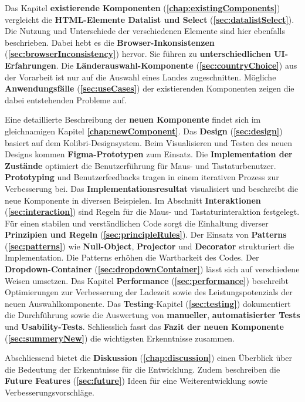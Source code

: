 Das Kapitel \textbf{existierende Komponenten} (\textbf{\ref{chap:existingComponents}}) vergleicht die \textbf{HTML-Elemente Datalist und Select} (\textbf{\ref{sec:datalistSelect}}). 
Die Nutzung und Unterschiede der verschiedenen Elemente sind hier ebenfalls beschrieben. 
Dabei hebt es die \textbf{Browser-Inkonsistenzen} (\textbf{\ref{sec:browserInconsistency}}) hervor. 
Sie führen zu \textbf{unterschiedlichen UI-Erfahrungen}. 
Die \textbf{Länderauswahl-Kom\-po\-nente} (\textbf{\ref{sec:countryChoice}}) aus der Vorarbeit ist nur auf die Auswahl eines Landes zugeschnitten. 
Mögliche \textbf{Anwendungsfälle} (\textbf{\ref{sec:useCases}}) der existierenden Komponenten zeigen die dabei entstehenden Probleme auf. 

Eine detaillierte Beschreibung der \textbf{neuen Komponente} findet sich im gleichnamigen Kapitel \textbf{\ref{chap:newComponent}}. 
Das \textbf{Design} (\textbf{\ref{sec:design}}) basiert auf dem Kolibri-Designsystem. 
Beim Visualisieren und Testen des neuen Designs kommen \textbf{Figma-Prototypen} zum Einsatz. 
Die \textbf{Implementation der Zustände} optimiert die Benutzerführung für Maus- und Tastaturbenutzer. 
\textbf{Prototyping} und Benutzerfeedbacks tragen in einem iterativen Prozess zur Verbesserung bei.
Das \textbf{Implementationsresultat} visualisiert und beschreibt die neue Komponente in diversen Beispielen.
Im Abschnitt \textbf{Interaktionen} (\textbf{\ref{sec:interaction}}) sind Regeln für die Maus- und Tastaturinteraktion festgelegt. 
Für einen stabilen und verständlichen Code sorgt die Einhaltung diverser \textbf{Prinzipien und Regeln} (\textbf{\ref{sec:principleRules}}). 
Der Einsatz von \textbf{Patterns} (\textbf{\ref{sec:patterns}}) wie \textbf{Null-Object}, \textbf{Projector} und \textbf{Decorator} strukturiert die Implementation. 
Die Patterns erhöhen die Wartbarkeit des Codes. 
Der \textbf{Dropdown-Container} (\textbf{\ref{sec:dropdownContainer}}) lässt sich auf verschiedene Weisen umsetzen. 
Das Kapitel \textbf{Performance} (\textbf{\ref{sec:performance}}) beschreibt Optimierungen zur Verbesserung der Ladezeit sowie des Leistungspotenzials der neuen Auswahlkomponente. 
Das \textbf{Testing}-Kapitel (\textbf{\ref{sec:testing}}) dokumentiert die Durchführung sowie die Auswertung von \textbf{manueller}, \textbf{automatisierter Tests} und \textbf{Usability-Tests}. 
Schliesslich fasst das \textbf{Fazit der neuen Komponente} (\textbf{\ref{sec:summeryNew}}) die wichtigsten Erkenntnisse zusammen. 

Abschliessend bietet die \textbf{Diskussion} (\textbf{\ref{chap:discussion}}) einen Überblick über die Bedeutung der Erkenntnisse für die Entwicklung. 
Zudem beschreiben die \textbf{Future Features} (\textbf{\ref{sec:future}}) Ideen für eine Weiterentwicklung sowie Verbesserungsvorschläge. 
